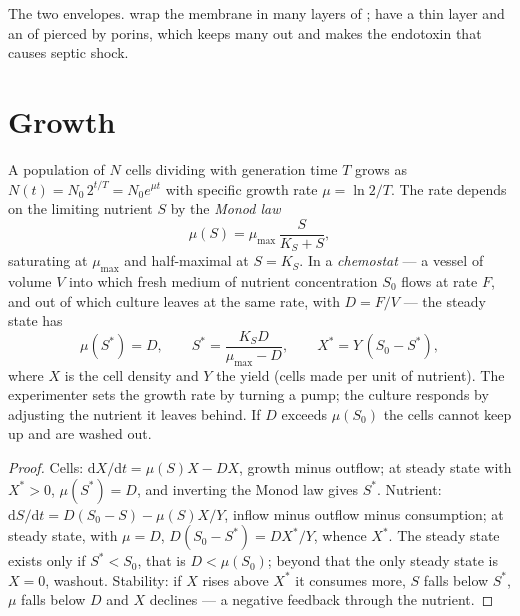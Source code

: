 \begin{omfigure}
{\small The two envelopes.  wrap the membrane in many
layers of ;  have a thin layer and an  of  pierced by porins, which keeps many
 out and makes the endotoxin that causes septic shock.}
\end{omfigure}

\section{Growth}

\begin{theorem}\label{thm:b3:bacteriology:monod}
A population of $N$ cells dividing with generation time $T$ grows as
$N(t) = N_{0}\,2^{t/T} = N_{0}e^{\mu t}$ with specific growth rate $\mu =
\ln 2/T$. The rate depends on the limiting nutrient $S$ by the
\emph{Monod law}
\[
\mu(S) = \mu_{\max}\,\frac{S}{K_{S} + S},
\]
saturating at $\mu_{\max}$ and half-maximal at $S = K_{S}$. In a
\emph{chemostat} --- a vessel of volume $V$ into which fresh medium of
nutrient concentration $S_{0}$ flows at rate $F$, and out of which
culture leaves at the same rate, with  $D = F/V$ --- the
steady state has
\[
\mu(S^{*}) = D,\qquad S^{*} = \frac{K_{S}D}{\mu_{\max} - D},\qquad
X^{*} = Y\,(S_{0} - S^{*}),
\]
where $X$ is the cell density and $Y$ the yield (cells made per unit of
nutrient). The experimenter sets the growth rate by turning a pump;
the culture responds by adjusting the nutrient it leaves behind. If $D$
exceeds $\mu(S_{0})$ the cells cannot keep up and are washed out.
\end{theorem}
\begin{proof}
Cells: $\mathrm{d}X/\mathrm{d}t = \mu(S)X - DX$, growth minus outflow;
at steady state with $X^{*} > 0$, $\mu(S^{*}) = D$, and inverting the
Monod law gives $S^{*}$. Nutrient: $\mathrm{d}S/\mathrm{d}t = D(S_{0} -
S) - \mu(S)X/Y$, inflow minus outflow minus consumption; at steady
state, with $\mu = D$, $D(S_{0} - S^{*}) = DX^{*}/Y$, whence $X^{*}$.
The steady state exists only if $S^{*} < S_{0}$, that is $D <
\mu(S_{0})$; beyond that the only steady state is $X = 0$, washout.
Stability: if $X$ rises above $X^{*}$ it consumes more, $S$ falls below
$S^{*}$, $\mu$ falls below $D$ and $X$ declines --- a negative feedback
through the nutrient.
\end{proof}

